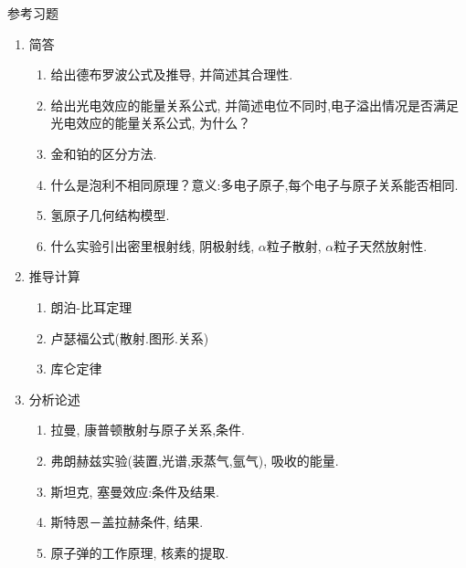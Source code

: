 \newpage
\appendix
\appendixpage

\begin{center}
{\Large 参考习题}
\end{center}

\begin{enumerate}
\item 简答
\begin{enumerate}
\item 给出德布罗波公式及推导, 并简述其合理性. 
\item 给出光电效应的能量关系公式, 并简述电位不同时,电子溢出情况是否满足光电效应的能量关系公式, 为什么？
\item 金和铂的区分方法. 
\item 什么是泡利不相同原理？意义:多电子原子,每个电子与原子关系能否相同.
\item 氢原子几何结构模型. 
\item 什么实验引出密里根射线, 阴极射线, $\alpha$粒子散射, $\alpha$粒子天然放射性.
\end{enumerate}

\item 推导计算
\begin{enumerate}
\item 朗泊-比耳定理
\item 卢瑟福公式(散射.图形.关系)
\item 库仑定律
\end{enumerate}

\item 分析论述
\begin{enumerate}
\item 拉曼, 康普顿散射与原子关系,条件. 
\item 弗朗赫兹实验(装置,光谱,汞蒸气,氩气), 吸收的能量. 
\item 斯坦克, 塞曼效应:条件及结果. 
\item 斯特恩－盖拉赫条件, 结果. 
\item 原子弹的工作原理, 核素的提取. 
\end{enumerate}

\end{enumerate}
